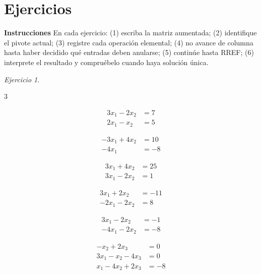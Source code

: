 \documentclass[12pt]{article}
\theoremstyle{remark}
\newtheorem{Ejer}[definicion]{Ejercicio}
\begin{document}
\section{Ejercicios}
\textbf{Instrucciones} En cada ejercicio: (1) escriba la matriz aumentada; (2) identifique
el pivote actual; (3) registre cada operación elemental; (4) no avance de columna hasta haber decidido qué entradas deben anularse; (5) continúe hasta RREF; (6) interprete el resultado y compruébelo cuando haya solución única.

\begin{Ejer}

\begin{enumerate}
\begin{multicols}{3}
\item \[
\begin{aligned}
3 x_{1} - 2 x_{2} &= 7\\
2 x_{1} - x_{2} &= 5
\end{aligned}
\]
\item 
\[
\begin{aligned}
- 3 x_{1} + 4 x_{2} &= 10\\
- 4 x_{1} &= -8
\end{aligned}
\]
\item
\[
\begin{aligned}
3 x_{1} + 4 x_{2} &= 25\\
3 x_{1} - 2 x_{2} &= 1
\end{aligned}
\]
\item \[
\begin{aligned}
3 x_{1} + 2 x_{2} &= -11\\
- 2 x_{1} - 2 x_{2} &= 8
\end{aligned}
\]
\item \[
\begin{aligned}
3 x_{1} - 2 x_{2} &= -1\\
- 4 x_{1} - 2 x_{2} &= -8
\end{aligned}
\]
\item \[
\begin{aligned}
- x_{2} + 2 x_{3} &= 0\\
3 x_{1} - x_{2} - 4 x_{3} &= 0\\
x_{1} - 4 x_{2} + 2 x_{3} &= -8
\end{aligned}
\]
\end{multicols}
\end{enumerate}

\end{Ejer}
\end{document}
